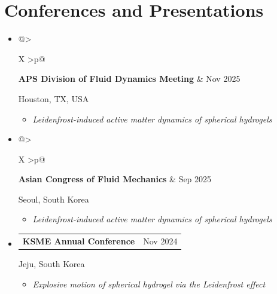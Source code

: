 \documentclass[a4paper,10pt]{article}
\makeatletter
\newcommand{\cvdate}[1]{\hfill \textcolor{textmain}{#1}}
\newcommand{\cvorg}[1]{\parbox[t]{\cvdetailwidth}{\textcolor{muted}{#1}}\par\vspace{-1pt}}
\newcommand{\cvitemtitle}[2]{\textbf{\textcolor{textmain}{#1}}\cvdate{#2}}
\newlength{\cvdatewidth}
\newlength{\cvdetailwidth}
\renewcommand{\cvitemtitle}[2]{%
  \begin{tabularx}{\linewidth}{@{}>{\raggedright\arraybackslash}X >{\raggedleft\arraybackslash}p{\cvdatewidth}@{}}
    \textbf{\textcolor{textmain}{#1}} & \textcolor{textmain}{#2}
  \end{tabularx}\par\vspace{-1pt}
}
\newenvironment{cvdetailblock}
  {\begin{minipage}{\cvdetailwidth}\raggedright\begin{itemize}}
  {\end{itemize}\end{minipage}}
\makeatother
\begin{document}
\section*{Conferences and Presentations}
\begin{itemize}
  \item \cvitemtitle{APS Division of Fluid Dynamics Meeting}{Nov 2025}
  \cvorg{Houston, TX, USA}
  \begin{cvdetailblock}
    \item \textit{Leidenfrost-induced active matter dynamics of spherical hydrogels}
  \end{cvdetailblock}

  \item \cvitemtitle{Asian Congress of Fluid Mechanics}{Sep 2025}
  \cvorg{Seoul, South Korea}
  \begin{cvdetailblock}
    \item \textit{Leidenfrost-induced active matter dynamics of spherical hydrogels}
  \end{cvdetailblock}

  \item \cvitemtitle{KSME Annual Conference}{Nov 2024}
  \cvorg{Jeju, South Korea}
  \begin{cvdetailblock}
    \item \textit{Explosive motion of spherical hydrogel via the Leidenfrost effect}
  \end{cvdetailblock}
\end{itemize}

\end{document}

